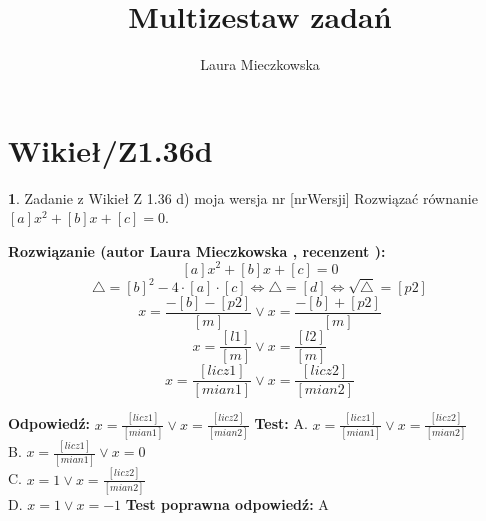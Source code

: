 \documentclass[12pt, a4paper]{article}
\title{Multizestaw zadań}
\author{Laura Mieczkowska}
\date{}
\theoremstyle{definition} %
\newtheorem{zad}{}
\newcommand{\kategoria}[1]{\section{#1}} %
\newcommand{\zadStart}[1]{\begin{zad}#1\newline} %
\newcommand{\zadStop}{\end{zad}}   %
\newcommand{\rozwStart}[2]{\noindent \textbf{Rozwiązanie (autor #1 , recenzent #2): }\newline} %
\newcommand{\odpStart}{\noindent \textbf{Odpowiedź:}\newline}    %
\newcommand{\odpStop}{\newline}                                             %
\newcommand{\testStart}{\noindent \textbf{Test:}\newline} %
\newcommand{\testStop}{\newline} %
\newcommand{\kluczStart}{\noindent \textbf{Test poprawna odpowiedź:}\newline} %
\newcommand{\kluczStop}{\newline} %
\begin{document}
\maketitle


\kategoria{Wikieł/Z1.36d}
\zadStart{Zadanie z Wikieł Z 1.36 d) moja wersja nr [nrWersji]}
Rozwiązać równanie $[a]x^2+[b]x+[c]=0$.
\zadStop
\rozwStart{Laura Mieczkowska}{}
$$[a]x^2+[b]x+[c]=0 $$ 
$$\triangle=[b]^2-4\cdot[a]\cdot[c] \Leftrightarrow \triangle=[d] \Leftrightarrow \sqrt{\triangle}=[p2]$$
$$x=\frac{-[b]-[p2]}{[m]} \vee x=\frac{-[b]+[p2]}{[m]}$$
$$x=\frac{[l1]}{[m]} \vee x=\frac{[l2]}{[m]}$$
$$x=\frac{[licz1]}{[mian1]} \vee x=\frac{[licz2]}{[mian2]}$$

\odpStart
$x=\frac{[licz1]}{[mian1]} \vee x=\frac{[licz2]}{[mian2]}$
\odpStop
\testStart
A. $x=\frac{[licz1]}{[mian1]} \vee x=\frac{[licz2]}{[mian2]}$ \\
B. $x=\frac{[licz1]}{[mian1]} \vee x=0$ \\
C. $x=1 \vee x=\frac{[licz2]}{[mian2]}$ \\
D. $x=1 \vee x=-1$ 
\testStop
\kluczStart
A
\kluczStop
\end{document}
